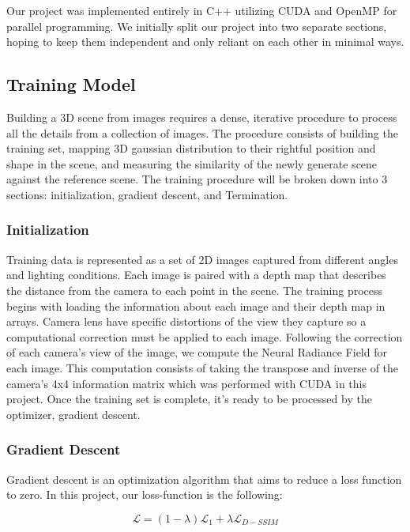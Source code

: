 \documentclass[12pt, a4paper, twocolumn]{article}
\begin{document}
Our project was implemented entirely in C++ utilizing CUDA and OpenMP for parallel programming. We initially split our project into two separate sections, hoping to keep them independent and only reliant on each other in minimal ways. 

\subsection{Training Model}

Building a 3D scene from images requires a dense, iterative procedure to process all the details from a collection of images. The procedure consists of building the training set, mapping 3D gaussian distribution to their rightful position and shape in the scene, and measuring the similarity of the newly generate scene against the reference scene. The training procedure will be broken down into 3 sections: initialization, gradient descent, and Termination.

\subsubsection{Initialization}

Training data is represented as a set of 2D images captured from different angles and lighting conditions. Each image is paired with a depth map that describes the distance from the camera to each point in the scene. The training process begins with loading the information about each image and their depth map in arrays. Camera lens have specific distortions of the view they capture so a computational correction must be applied to each image. Following the correction of each camera's view of the image, we compute the Neural Radiance Field for each image. This computation consists of taking the transpose and inverse of the camera's 4x4 information matrix which was performed with CUDA in this project. Once the training set is complete, it's ready to be processed by the optimizer, gradient descent.

\subsubsection{Gradient Descent}

Gradient descent is an optimization algorithm that aims to reduce a loss function to zero. In this project, our loss-function is the following:

\begin{equation}
    \mathcal{L} = (1-\lambda)\mathcal{L}_1 + \lambda \mathcal{L}_{D-SSIM}
\end{equation}
\end{document}
